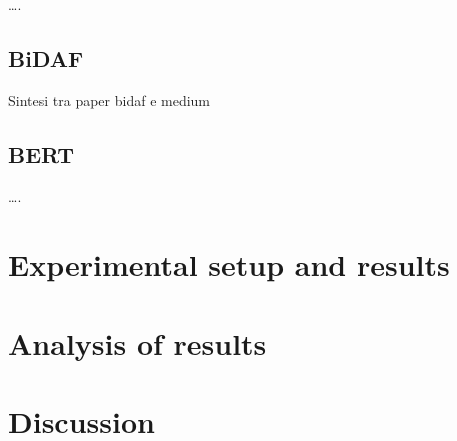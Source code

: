 \documentclass[a4paper,10pt]{report}
\begin{document}
….

\section{BiDAF}\label{sec:bidaf}

Sintesi tra paper bidaf e medium

\section{BERT}\label{sec:bert}

….

\chapter{Experimental setup and results}\label{chap:experiments}

\chapter{Analysis of results}\label{chap:analysis-results}

\chapter{Discussion}\label{chap:discussion}

\printbibliography
\end{document}
